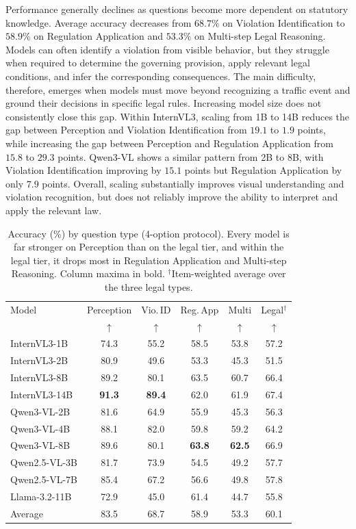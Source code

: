 Performance generally declines as questions become more dependent on statutory knowledge. Average accuracy decreases from $68.7\%$ on Violation Identification to $58.9\%$ on Regulation Application and $53.3\%$ on Multi-step Legal Reasoning. Models can often identify a violation from visible behavior, but they struggle when required to determine the governing provision, apply relevant legal conditions, and infer the corresponding consequences. The main difficulty, therefore, emerges when models must move beyond recognizing a traffic event and ground their decisions in specific legal rules. Increasing model size does not consistently close this gap. Within InternVL3, scaling from 1B to 14B reduces the gap between Perception and Violation Identification from $19.1$ to $1.9$ points, while increasing the gap between Perception and Regulation Application from $15.8$ to $29.3$ points. Qwen3-VL shows a similar pattern from 2B to 8B, with Violation Identification improving by $15.1$ points but Regulation Application by only $7.9$ points. Overall, scaling substantially improves visual understanding and violation recognition, but does not reliably improve the ability to interpret and apply the relevant law.

\begin{table}[t]
\centering\small
\setlength{\tabcolsep}{4pt}
\begin{tabular}{lccccc}
\toprule
Model & Perception & Vio.\,ID & Reg.\,App & Multi & Legal$^{\dagger}$ \\
& $\uparrow$ & $\uparrow$ & $\uparrow$ & $\uparrow$ & $\uparrow$ \\
\midrule
InternVL3-1B  & 74.3 & 55.2 & 58.5 & 53.8 & 57.2 \\
InternVL3-2B  & 80.9 & 49.6 & 53.3 & 45.3 & 51.5 \\
InternVL3-8B  & 89.2 & 80.1 & 63.5 & 60.7 & 66.4 \\
InternVL3-14B & \textbf{91.3} & \textbf{89.4} & 62.0 & 61.9 & 67.4 \\
Qwen3-VL-2B   & 81.6 & 64.9 & 55.9 & 45.3 & 56.3 \\
Qwen3-VL-4B   & 88.1 & 82.0 & 59.8 & 59.2 & 64.2 \\
Qwen3-VL-8B   & 89.6 & 80.1 & \textbf{63.8} & \textbf{62.5} & 66.9 \\
Qwen2.5-VL-3B & 81.7 & 73.9 & 54.5 & 49.2 & 57.7 \\
Qwen2.5-VL-7B & 85.4 & 67.2 & 56.6 & 49.8 & 57.8 \\
Llama-3.2-11B & 72.9 & 45.0 & 61.4 & 44.7 & 55.8 \\
\midrule
Average
& 83.5
& 68.7
& 58.9
& 53.3
& 60.1 \\
\bottomrule
\end{tabular}
\caption{Accuracy (\%) by question type (4-option protocol). Every model is far stronger on Perception than on the legal tier, and within the legal tier, it drops most in Regulation Application and Multi-step Reasoning. Column maxima in bold. $^{\dagger}$Item-weighted average over the three legal types.}
\label{tab:pertype}
\end{table}

